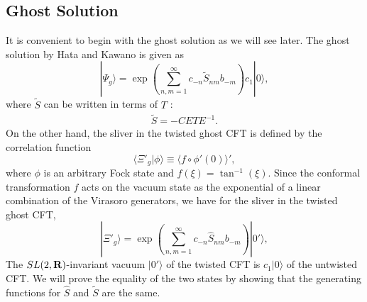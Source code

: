 \documentclass[a4paper,12pt]{article}
\begin{document}
\subsection{Ghost Solution}
It is convenient to begin with the ghost solution as we will see later.
The ghost solution by Hata and Kawano is given as \cite{Hata-Kawano}
\begin{equation}
|\Psi_g \rangle = \exp\left (\sum_{n,m=1}^{\infty}
 c_{-n} \widetilde{S}_{nm}b_{-m}\right )c_1|0\rangle,
\end{equation}
where $\widetilde{S}$ can be written in terms of $T$ \cite{Okuyama-kinetic}:
\begin{eqnarray}\label{S-widetilde-CETE}
\widetilde{S}=-CETE^{-1}.
\end{eqnarray}
On the other hand, the sliver in the twisted ghost CFT is defined by the correlation
function \cite{GRSZstructure}
\begin{equation}
\langle \Xi'_g |\phi \rangle \equiv \langle f \circ \phi'(0)
\rangle ',
\end{equation}
where $\phi$ is an arbitrary Fock state and $ f(\xi) = \tan^{-1}(\xi)$.
Since the conformal transformation $f$ acts on the vacuum state
as the exponential of a linear combination of the Virasoro generators,
we have for the sliver in the twisted ghost CFT,
\begin{equation}
|\Xi'_g \rangle = \exp\left (\sum_{n,m=1}^{\infty}
 c_{-n} \widehat{S}_{nm}b_{-m}\right )|0'\rangle,
\end{equation}
The $SL(2,{\bf R})$-invariant vacuum $|0'\rangle$ of the twisted CFT is
$c_1|0\rangle$ of the untwisted CFT.
We will prove the equality of the two states by showing that
the generating functions for $\widehat{S}$ and $\widetilde{S}$ are
the same.
\end{document}
